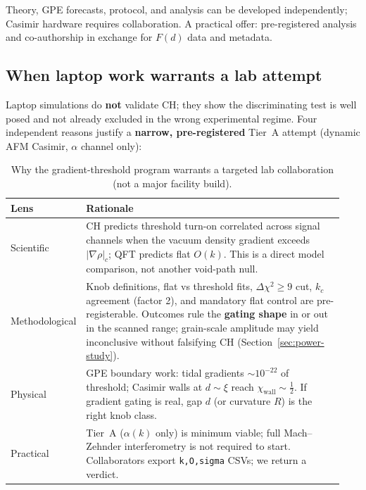 \documentclass[11pt,a4paper]{article}
\begin{document}
Theory, GPE forecasts, protocol, and analysis can be developed independently; Casimir hardware requires collaboration.
A practical offer: pre-registered analysis and co-authorship in exchange for $F(d)$ data and metadata.

\subsection{When laptop work warrants a lab attempt}
\label{sec:lab-warrant}

Laptop simulations do \textbf{not} validate CH; they show the discriminating test is well posed and not already excluded in the wrong experimental regime.
Four independent reasons justify a \textbf{narrow, pre-registered} Tier~A attempt (dynamic AFM Casimir, $\alpha$ channel only):

\begin{table}[htbp]
  \centering
  \small
  \caption{Why the gradient-threshold program warrants a targeted lab collaboration (not a major facility build).}
  \label{tab:lab-warrant}
  \begin{tabular}{@{}p{0.14\linewidth}p{0.80\linewidth}@{}}
    \toprule
    Lens & Rationale \\
    \midrule
    Scientific &
    CH predicts threshold turn-on correlated across signal channels when the vacuum density gradient exceeds $|\nabla\rho|_c$; QFT predicts flat $O(k)$. This is a direct model comparison, not another void-path null. \\
    Methodological &
    Knob definitions, flat vs threshold fits, $\Delta\chi^2 \geq 9$ cut, $k_c$ agreement (factor 2), and mandatory flat control are pre-registerable. Outcomes rule the \textbf{gating shape} in or out in the scanned range; grain-scale amplitude may yield inconclusive without falsifying CH (Section~\ref{sec:power-study}). \\
    Physical &
    GPE boundary work: tidal gradients $\sim 10^{-22}$ of threshold; Casimir walls at $d \sim \xi$ reach $\chi_{\mathrm{wall}} \sim \tfrac{1}{2}$. If gradient gating is real, gap $d$ (or curvature $R$) is the right knob class. \\
    Practical &
    Tier~A ($\alpha(k)$ only) is minimum viable; full Mach--Zehnder interferometry is not required to start. Collaborators export \texttt{k,O,sigma} CSVs; we return a verdict. \\
    \bottomrule
  \end{tabular}
\end{table}
\end{document}
